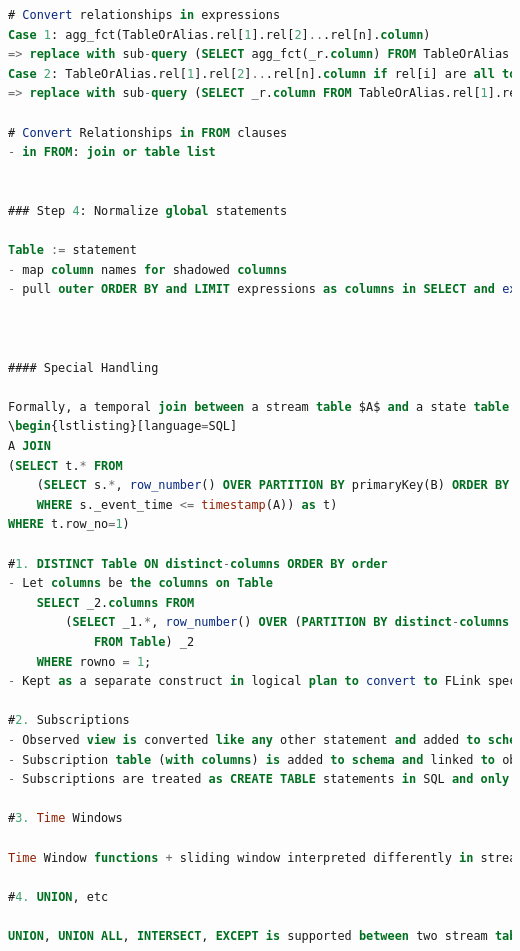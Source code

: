 \documentclass[	DIV=calc,%
							paper=letter,%
							fontsize=11pt,%
							twocolumn]{scrartcl}	 					%
\begin{document}
\begin{lstlisting}[language=SQL]
# Convert relationships in expressions
Case 1: agg_fct(TableOrAlias.rel[1].rel[2]...rel[n].column)
=> replace with sub-query (SELECT agg_fct(_r.column) FROM TableOrAlias.rel[1].rel[2]...rel[n] AS _r)
Case 2: TableOrAlias.rel[1].rel[2]...rel[n].column if rel[i] are all to-0/1 relationships
=> replace with sub-query (SELECT _r.column FROM TableOrAlias.rel[1].rel[2]...rel[n] AS _r)

# Convert Relationships in FROM clauses
- in FROM: join or table list


### Step 4: Normalize global statements

Table := statement
- map column names for shadowed columns
- pull outer ORDER BY and LIMIT expressions as columns in SELECT and extract as meta data for Table in schema



#### Special Handling

Formally, a temporal join between a stream table $A$ and a state table $B$ is defined as:
\begin{lstlisting}[language=SQL]
A JOIN
(SELECT t.* FROM
	(SELECT s.*, row_number() OVER PARTITION BY primaryKey(B) ORDER BY s._event_time DESC AS row_no FROM (SUBSCRIBE ON CHANGE TO B) as s
	WHERE s._event_time <= timestamp(A)) as t)
WHERE t.row_no=1)

#1. DISTINCT Table ON distinct-columns ORDER BY order
- Let columns be the columns on Table
    SELECT _2.columns FROM
        (SELECT _1.*, row_number() OVER (PARTITION BY distinct-columns ORDER BY order) AS rowno
            FROM Table) _2
    WHERE rowno = 1;
- Kept as a separate construct in logical plan to convert to FLink special handlign

#2. Subscriptions
- Observed view is converted like any other statement and added to schema and logical plans
- Subscription table (with columns) is added to schema and linked to observed view with observation type (ADD, DELETE, UPDATE)
- Subscriptions are treated as CREATE TABLE statements in SQL and only materialized in flink by producing a change-stream

#3. Time Windows

Time Window functions + sliding window interpreted differently in streaming vs query (need to add watermark filter for window functions, sliding window is not continuous in streaming)

#4. UNION, etc

UNION, UNION ALL, INTERSECT, EXCEPT is supported between two stream tables if they have the same timestamp column. The semantics of these operations are the normal SQL semantics. The special SQL columns _uid, _source_time, _ingest_time are not considered in the comparison, however, the timestamp column always is. The result is a stream with the same timestamp.


\end{lstlisting}
\end{document}
